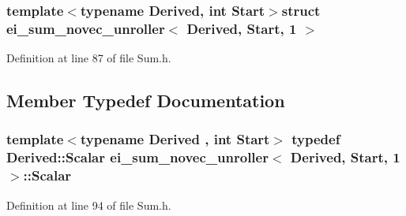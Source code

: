\subsubsection*{template$<$typename Derived, int Start$>$struct ei\-\_\-sum\-\_\-novec\-\_\-unroller$<$ Derived, Start, 1 $>$}



Definition at line 87 of file Sum.\-h.



\subsection{Member Typedef Documentation}
\hypertarget{structei__sum__novec__unroller_3_01_derived_00_01_start_00_011_01_4_ae54f9f138b17a0cfa4ed0a2a168929ec}{
\subsubsection[{Scalar}]{\setlength{\rightskip}{0pt plus 5cm}template$<$typename Derived , int Start$>$ typedef Derived\-::\-Scalar {\bf ei\-\_\-sum\-\_\-novec\-\_\-unroller}$<$ Derived, Start, 1 $>$\-::{\bf Scalar}}}\label{structei__sum__novec__unroller_3_01_derived_00_01_start_00_011_01_4_ae54f9f138b17a0cfa4ed0a2a168929ec}


Definition at line 94 of file Sum.\-h.



